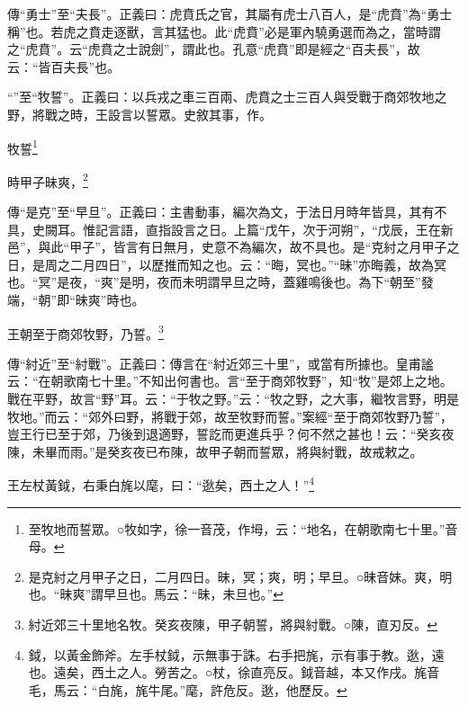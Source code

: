 {\noindent\zhuan{}\fzbyks 傳“勇士”至“夫長”。正義曰：虎賁氏之官，其屬有虎士八百人，是“虎賁”為“勇士稱”也。若虎之賁走逐獸，言其猛也。此“虎賁”必是軍內驍勇選而為之，當時謂之“虎賁”。云“虎賁之士說劍”，謂此也。孔意“虎賁”即是經之“百夫長”，故云：“皆百夫長”也。 \par}

{\noindent\shu{}\fzkt “”至“牧誓”。正義曰：以兵戎之車三百兩、虎賁之士三百人與受戰于商郊牧地之野，將戰之時，王設言以誓眾。史敘其事，作。 \par}

牧誓\footnote{至牧地而誓眾。○牧如字，徐一音茂，作坶，云：“地名，在朝歌南七十里。”音母。}

時甲子昧爽，\footnote{是克紂之月甲子之日，二月四日。昧，冥；爽，明；早旦。○昧音妹。爽，明也。“昧爽”謂早旦也。馬云：“昧，未旦也。”}

{\noindent\zhuan{}\fzbyks 傳“是克”至“早旦”。正義曰：主書動事，編次為文，于法日月時年皆具，其有不具，史闕耳。惟記言語，直指設言之日。上篇“戊午，次于河朔”，“戊辰，王在新邑”，與此“甲子”，皆言有日無月，史意不為編次，故不具也。是“克紂之月甲子之日，是周之二月四日”，以歷推而知之也。云：“晦，冥也。”“昧”亦晦義，故為冥也。“冥”是夜，“爽”是明，夜而未明謂早旦之時，蓋雞鳴後也。為下“朝至”發端，“朝”即“昧爽”時也。 \par}

王朝至于商郊牧野，乃誓。\footnote{紂近郊三十里地名牧。癸亥夜陳，甲子朝誓，將與紂戰。○陳，直刃反。}

{\noindent\zhuan{}\fzbyks 傳“紂近”至“紂戰”。正義曰：傳言在“紂近郊三十里”，或當有所據也。皇甫謐云：“在朝歌南七十里。”不知出何書也。言“至于商郊牧野”，知“牧”是郊上之地。戰在平野，故言“野”耳。云：“于牧之野。”云：“牧之野，之大事，繼牧言野，明是牧地。”而云：“郊外曰野，將戰于郊，故至牧野而誓。”案經“至于商郊牧野乃誓”，豈王行已至于郊，乃後到退適野，誓訖而更進兵乎？何不然之甚也！云：“癸亥夜陳，未畢而雨。”是癸亥夜已布陳，故甲子朝而誓眾，將與紂戰，故戒敕之。 \par}

王左杖黃鉞，右秉白旄以麾，曰：“逖矣，西土之人！”\footnote{鉞，以黃金飾斧。左手杖鉞，示無事于誅。右手把旄，示有事于教。逖，遠也。遠矣，西土之人。勞苦之。○杖，徐直亮反。鉞音越，本又作戌。旄音毛，馬云：“白旄，旄牛尾。”麾，許危反。逖，他歷反。}

